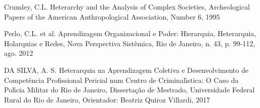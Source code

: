 \documentclass[
12pt,		%
openright,	%
twoside,  %
a4paper,			%
chapter=TITLE,		%
english,			%
french,				%
spanish,			%
brazil				%
]{USPSC-classe/USPSC}
\begin{document}
\begin{flushleft}
\begin{flushleft}
\begin{flushleft}
\begin{flushleft}
[CRUMLEY, 1995] Crumley, C.L. Heterarchy and the Analysis of Complex Societies, Archeological Papers of the American Anthropological Association, Number 6, 1995
\end{flushleft}


\end{flushleft}


\end{flushleft}


\end{flushleft}


\begin{flushleft}
\begin{flushleft}
\begin{flushleft}
\begin{flushleft}
[PERLO et al., 2012] Perlo, C.L. et al. Aprendizagem Organizacional e Poder: Hierarquia, Heterarquia, Holarquias e Redes, Nova Perspectiva Sist\^emica, Rio de Janeiro, n. 43, p. 99-112, ago. 2012
\end{flushleft}


\end{flushleft}


\end{flushleft}


\end{flushleft}


\begin{flushleft}
\begin{flushleft}
\begin{flushleft}
\begin{flushleft}
[DA SILVA, 2017] DA SILVA, A. S. Heterarquia na Aprendizagem Coletiva e Desenvolvimento de Compet\^encia
Profissional Pericial num Centro de Criminal\'{\i}stica:
O Caso da Pol\'{\i}cia Militar do Rio de Janeiro, Disserta\c{c}\~ao de Mestrado, Universidade Federal Rural do Rio de Janeiro, Orientador: Beatriz Quiroz Villardi, 2017
\end{flushleft}


\end{flushleft}


\end{flushleft}


\end{flushleft}
\end{document}
